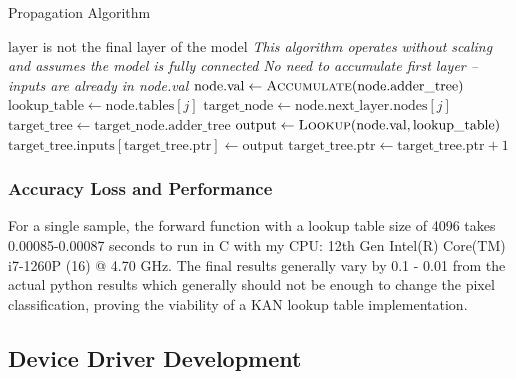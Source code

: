 \documentclass{article}
\begin{document}
\begin{algorithm}[H]
    \caption{Propagation Algorithm}
    \label{alg:propagate}
    \begin{algorithmic}[1]
        \Require $\text{layer}$ is not the final layer of the model
        \Statex \textit{This algorithm operates without scaling and assumes the model is fully connected}
            \State \textit{No need to accumulate first layer -- inputs are already in node.val}
                    \State $\text{node}.\text{val} \gets \Call{Accumulate}{\text{node}.\text{adder\_tree}}$
                \EndIf
                    \State $\text{lookup\_table} \gets \text{node}.\text{tables}[j]$
                    \State $\text{target\_node} \gets \text{node}.\text{next\_layer}.\text{nodes}[j]$
                    \State $\text{target\_tree} \gets \text{target\_node}.\text{adder\_tree}$
                    \State $\text{output} \gets \Call{Lookup}{\text{node}.\text{val}, \text{lookup\_table}}$
                    \State $\text{target\_tree}.\text{inputs}[\text{target\_tree}.\text{ptr}] \gets \text{output}$
                    \State $\text{target\_tree}.\text{ptr} \gets \text{target\_tree}.\text{ptr} + 1$
                \EndFor
            \EndFor
        \EndFunction
    \end{algorithmic}
\end{algorithm}


\subsubsection{Accuracy Loss and Performance}
For a single sample, the forward function with a lookup table size of 4096 takes 0.00085-0.00087 seconds to run in C with my CPU: 12th Gen Intel(R) Core(TM) i7-1260P (16) @ 4.70 GHz. The final results generally vary by 0.1 - 0.01 from the actual python results which generally should not be enough to change the pixel classification, proving the viability of a KAN lookup table implementation.

\subsection{Device Driver Development}
\end{document}
